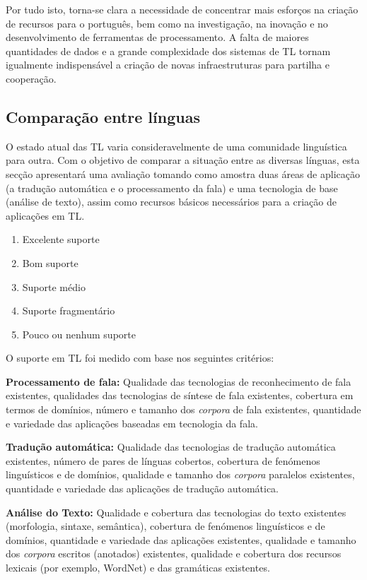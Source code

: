 \begin{multicols}{2}
Por tudo isto, torna-se clara a necessidade de concentrar mais esforços na criação de recursos para o português, bem como na investigação, na inovação e no desenvolvimento de ferramentas de processamento. A falta de maiores quantidades de dados e a grande complexidade dos sistemas de TL tornam igualmente indispensável a criação de novas infraestruturas para partilha e cooperação.

\subsection{Comparação entre línguas}

 O estado atual das TL varia consideravelmente de uma comunidade linguística para outra. Com o objetivo de comparar a situação entre as diversas línguas, esta secção apresentará uma avaliação tomando como amostra duas áreas de aplicação (a tradução automática e o processamento da fala) e uma tecnologia de base (análise de texto), assim como recursos básicos necessários para a criação de aplicações em TL.

\begin{enumerate}
\item Excelente suporte 
\item Bom suporte 
\item Suporte médio
\item Suporte fragmentário
\item Pouco ou nenhum suporte
\end{enumerate}

O suporte em TL foi medido com base nos seguintes critérios:

\textbf{Processamento de fala:} Qualidade das tecnologias de reconhecimento de fala existentes, qualidades das tecnologias de síntese de fala existentes, cobertura em termos de domínios, número e tamanho dos \textit{corpora} de fala existentes, quantidade e variedade das aplicações baseadas em tecnologia da fala.

\textbf{Tradução automática:} Qualidade das tecnologias de tradução automática existentes, número de pares de línguas cobertos, cobertura de fenómenos linguísticos e de domínios, qualidade e tamanho dos \textit{corpora} paralelos existentes, quantidade e variedade das aplicações de tradução automática.

\textbf{Análise do Texto:} Qualidade e cobertura das tecnologias do texto existentes (morfologia, sintaxe, semântica), cobertura de fenómenos linguísticos e de domínios, quantidade e variedade das aplicações existentes, qualidade e tamanho dos \textit{corpora} escritos (anotados) existentes, qualidade e cobertura dos recursos lexicais (por exemplo, WordNet) e das gramáticas e\-xis\-ten\-tes.


\end{multicols}
